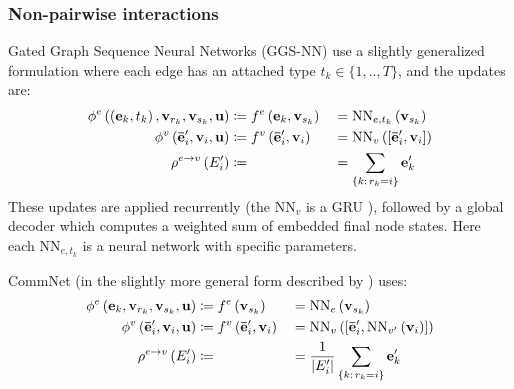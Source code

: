 \subsubsection*{Non-pairwise interactions}

Gated Graph Sequence Neural Networks (GGS-NN) \citep{li2015gated} use a slightly generalized formulation where each edge has an attached type $t_k \in \{1, .., T\}$, and the updates are:
\begin{alignat*}{3}
\phi^e\left(\left(\mathbf{e}_k, t_k\right), \mathbf{v}_{r_k}, \mathbf{v}_{s_k}, \globals\right) &\coloneqq f^e\left(\mathbf{e}_k, \mathbf{v}_{s_k}\right) &&= \mathrm{NN}_{e, t_k}\left(\mathbf{v}_{s_k}\right) \\
%
\phi^v\left(\mathbf{\bar{e}}'_i, \mathbf{v}_i, \globals\right) &\coloneqq f^v\left(\mathbf{\bar{e}}'_i, \mathbf{v}_i\right) &&= \mathrm{NN}_v\left([\mathbf{\bar{e}}'_i, \mathbf{v}_i]\right) \\
\rho^{e\rightarrow v}\left(E'_i\right) &\coloneqq \; &&= \sum_{\{k:\, r_k=i\}} \mathbf{e}'_k \\
\end{alignat*}
These updates are applied recurrently (the $\mathrm{NN}_v$ is a GRU \citep{cho2014learning}), followed by a global decoder which computes a weighted sum of embedded final node states. Here each $\mathrm{NN}_{e, t_k}$ is a neural network with specific parameters.

CommNet \citep{sukhbaatar2016learning} (in the slightly more general form described by \citep{hoshen2017vain}) uses:
\begin{alignat*}{3}
\phi^e\left(\mathbf{e}_k, \mathbf{v}_{r_k}, \mathbf{v}_{s_k}, \globals\right) &\coloneqq f^e\left(\mathbf{v}_{s_k}\right) &&= \mathrm{NN}_e \left(\mathbf{v}_{s_k}\right) \\
%
\phi^v\left(\mathbf{\bar{e}}'_i, \mathbf{v}_i, \globals\right) &\coloneqq f^v\left(\mathbf{\bar{e}}'_i, \mathbf{v}_i\right) &&= \mathrm{NN}_v \left([\mathbf{\bar{e}}'_i, \mathrm{NN}_{v'}\left(\mathbf{v}_i\right)]\right) \\
\rho^{e\rightarrow v}\left(E'_i\right) &\coloneqq \; &&= \frac{1}{|E'_i|} \sum_{\{k:\, r_k=i\}} \mathbf{e}'_k \\
\end{alignat*}

